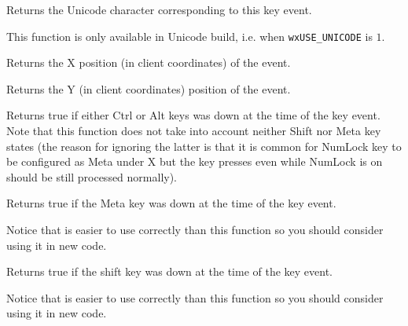 \label{wxkeyeventgetunicodekey}


Returns the Unicode character corresponding to this key event.

This function is only available in Unicode build, i.e. when
\texttt{wxUSE\_UNICODE} is $1$.


\label{wxkeyeventgetx}


Returns the X position (in client coordinates) of the event.


\label{wxkeyeventgety}


Returns the Y (in client coordinates) position of the event.


\label{wxkeyeventhasmodifiers}


Returns true if either {\sc Ctrl} or {\sc Alt} keys was down
at the time of the key event. Note that this function does not take into
account neither {\sc Shift} nor {\sc Meta} key states (the reason for ignoring
the latter is that it is common for {\sc NumLock} key to be configured as
{\sc Meta} under X but the key presses even while {\sc NumLock} is on should
be still processed normally).


\label{wxkeyeventmetadown}


Returns true if the Meta key was down at the time of the key event.

Notice that  is easier to use
correctly than this function so you should consider using it in new code.


\label{wxkeyeventshiftdown}


Returns true if the shift key was down at the time of the key event.

Notice that  is easier to use
correctly than this function so you should consider using it in new code.

